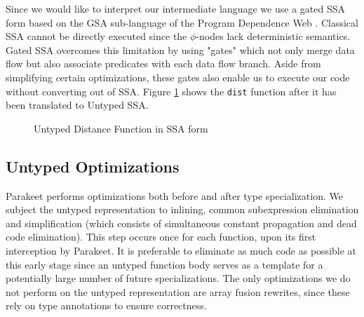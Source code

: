 \documentclass[preprint]{sigplanconf}
\begin{document}
Since we would like to interpret our intermediate language we use a gated SSA
form based on the GSA sub-language of the Program Dependence Web \cite{Ott90}.
Classical SSA cannot be directly executed since the $\phi$-nodes lack
deterministic semantics. Gated SSA overcomes this limitation by using "gates"
which not only merge data flow but also associate predicates with each data flow
branch. Aside from simplifying certain optimizations, these gates also enable us
to execute our code without converting out of SSA.  Figure \ref{UntypedSSADist}
shows the \texttt{dist} function after it has been translated to Untyped SSA.

\begin{figure}[h!]
\caption{Untyped Distance Function in SSA form}
\label{UntypedSSADist}
\end{figure}


\subsection{Untyped Optimizations}
Parakeet performs optimizations both before and after type specialization. We
subject the untyped representation to inlining, common subexpression elimination
and simplification (which consists of simultaneous constant propagation and dead
code elimination). This step occurs once for each function, upon its first
interception by Parakeet. It is preferable to eliminate as much code as possible
at this early stage since an untyped function body serves as a template for a
potentially large number of future specializations. The only optimizations we do
not perform on the untyped representation are array fusion rewrites, since these
rely on type annotations to ensure correctness.
\end{document}
